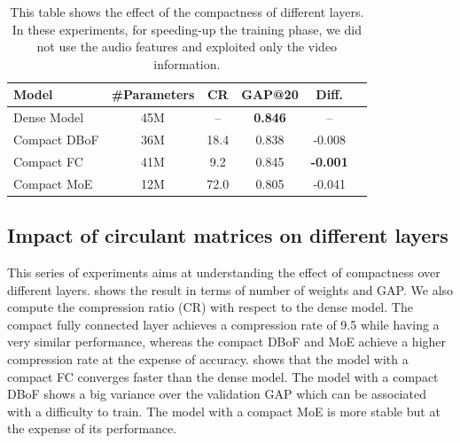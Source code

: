\begin{table}[ht]
  \centering
  \begin{tabular}{lccccc}
    \toprule
    \textbf{Model} & \textbf{\#Parameters} & \textbf{CR} & \textbf{GAP@20} & \textbf{Diff.} \\
    \midrule
    Dense Model  & 45M &   -- & \textbf{0.846} & -- \\
    Compact DBoF & 36M & 18.4 & 0.838 & -0.008\\
    Compact FC   & 41M &  9.2 & 0.845 & \textbf{-0.001} \\
    Compact MoE  & 12M & 72.0 & 0.805 & -0.041 \\
   \bottomrule
  \end{tabular}
  \caption{This table shows the effect of the compactness of different layers. In these experiments, for speeding-up  the training phase, we did not use the audio features and exploited only the video information.}
  \label{table:ap4-circulant_layer}
\end{table}


\subsection{Impact of circulant matrices on different layers}

This series of experiments aims at understanding the effect of compactness over different layers.
 shows the result in terms of number of weights and GAP.
We also compute the compression ratio (CR) with respect to the dense model.
The compact fully connected layer achieves a compression rate of 9.5 while having a very similar performance, whereas the compact DBoF and MoE achieve a higher compression rate at the expense of accuracy. 
 shows that the model with a compact FC converges faster than the dense model.
The model with a compact DBoF shows a big variance over the validation GAP which can be associated with a difficulty to train.
The model with a compact MoE is more stable but at the expense of its performance.

